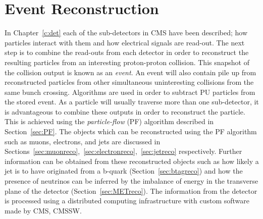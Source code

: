 \chapter{Event Reconstruction}
\label{c:recon}


In Chapter~\ref{c:det} each of the sub-detectors in CMS have been described; how particles interact with them and how electrical signals are read-out. The next step is to combine the read-outs from each detector in order to reconstruct the resulting particles from an interesting proton-proton collision. This snapshot of the collision output is known as an \emph{event}. An event will also contain pile up from reconstructed particles from other simultaneous uninteresting collisions from the same bunch crossing. Algorithms are used in order to subtract PU particles from the stored event. 
As a particle will usually traverse more than one sub-detector, it is advantageous to combine these outputs in order to reconstruct the particle. This is achieved using the \emph{particle-flow} (PF) algorithm described in Section~\ref{sec:PF}. The objects which can be reconstructed using the PF algorithm such as muons, electrons, and jets are discussed in Sections~\ref{sec:muonreco},~\ref{sec:electronreco},~\ref{sec:jetreco} respectively. Further information can be obtained from these reconstructed objects such as how likely a jet is to have originated from a b-quark (Section~\ref{sec:btagreco}) and how the presence of neutrinos can be inferred by the imbalance of energy in the transverse plane of the detector (Section~\ref{sec:METreco}).  
The information from the detector is processed using a distributed computing infrastructure with custom software made by CMS, CMSSW.




